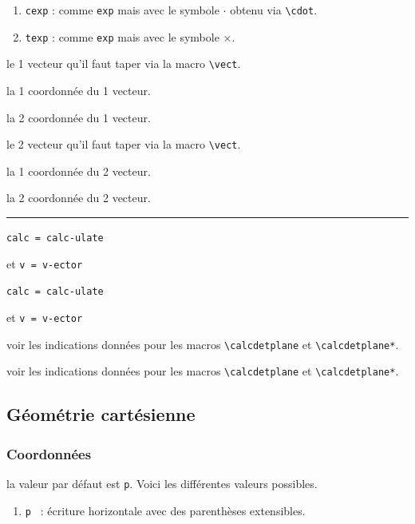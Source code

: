 \documentclass[12pt,a4paper]{book}
\newcommand\env[1]{\texttt{#1}}
\newcommand\macro[1]{\env{\textbackslash{}#1}}
\theoremstyle{definition}
\newcommand\separation{
	\medskip
	\hfill\rule{0.5\textwidth}{0.75pt}\hfill
	\medskip
}
\newcommand\mwhyprefix[2]{%
	\texttt{#1 = #1-#2}%
}
\begin{document}
{{\begin{enumerate}
	\item \verb+cexp+ : comme \verb+exp+ mais avec le symbole $\cdot$ obtenu via \macro{cdot}.

	\item \verb+texp+ : comme \verb+exp+ mais avec le symbole $\times$.
\end{enumerate}


 le 1\ier{} vecteur qu'il faut taper via la macro \macro{vect}.

 la 1\iere{} coordonnée du 1\ier{} vecteur.

 la 2\ieme{} coordonnée du 1\ier{} vecteur.

 le 2\ieme{} vecteur qu'il faut taper via la macro \macro{vect}.

 la 1\iere{} coordonnée du 2\ieme{} vecteur.

 la 2\ieme{} coordonnée du 2\ieme{} vecteur.


\separation


 \hfill \mwhyprefix{calc}{ulate}
                                   et \mwhyprefix{v}{ector}

 \hfill \mwhyprefix{calc}{ulate}
                                   et \mwhyprefix{v}{ector}


\IDoption{} voir les indications données pour les macros \macro{calcdetplane} et \macro{calcdetplane*}.

 voir les indications données pour les macros \macro{calcdetplane} et \macro{calcdetplane*}.


\subsection{Géométrie cartésienne}

\subsubsection{Coordonnées} \label{tnsgeo-coordinates}



\label{tnsgeo-coordinates-tech}



\IDoption{} la valeur par défaut est \verb+p+. Voici les différentes valeurs possibles.
\begin{enumerate}
	\item \verb+p + : écriture horizontale avec des parenthèses extensibles.


\end{enumerate}}}
\end{document}
